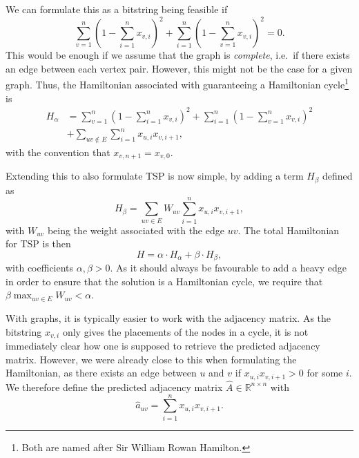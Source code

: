 We can formulate this as a bitstring being feasible if
\begin{equation}
    \sum_{v = 1}^n \left( 1 - \sum_{i = 1}^n x_{v,i} \right)^2 + \sum_{i = 1}^n \left( 1 - \sum_{v = 1}^n x_{v,i} \right)^2 = 0.
\end{equation}
This would be enough if we assume that the graph is \textit{complete}, i.e.\ if there exists an edge between each vertex pair.
However, this might not be the case for a given graph.
Thus, the Hamiltonian associated with guaranteeing a Hamiltonian cycle\footnote{Both are named after Sir William Rowan Hamilton.} is
\begin{equation}\label{eq:H_A}
\begin{split}
    H_{\alpha} &= \sum_{v = 1}^n \left( 1 - \sum_{i = 1}^n x_{v,i} \right)^2 + \sum_{i = 1}^n \left( 1 - \sum_{v = 1}^n x_{v,i} \right)^2 \\
    &+ \sum_{uv \notin E}\sum_{i = 1}^n x_{u,i}x_{v,i+1},
\end{split}
\end{equation}
with the convention that $x_{v,n+1} = x_{v,0}$.

Extending this to also formulate TSP is now simple, by adding a term $H_{\beta}$ defined as
\begin{equation}
    H_{\beta} = \sum_{uv \in E} W_{uv} \sum_{i = 1}^n x_{u,i}x_{v,i+1},
\end{equation}
with $W_{uv}$ being the weight associated with the edge $uv$.
The total Hamiltonian for TSP is then
\begin{equation}\label{eq:Hamilton_TSP}
    H = \alpha \cdot H_{\alpha} + \beta \cdot H_{\beta},
\end{equation}
with coefficients $\alpha,\beta > 0$.
As it should always be favourable to add a heavy edge in order to ensure that the solution is a Hamiltonian cycle, we require that $\beta \max_{uv \in E} W_{uv} < \alpha$.

With graphs, it is typically easier to work with the adjacency matrix.
As the bitstring $x_{v,i}$ only gives the placements of the nodes in a cycle, it is not immediately clear how one is supposed to retrieve the predicted adjacency matrix.
However, we were already close to this when formulating the Hamiltonian, as there exists an edge between $u$ and $v$ if $x_{u,i}x_{v,i+1} > 0$ for some $i$.
We therefore define the predicted adjacency matrix $\hat{A} \in \mathbb{R}^{n \times n}$ with
\begin{equation}\label{eq:A_sum}
    \hat{a}_{uv} = \sum_{i = 1}^n x_{u,i} x_{v,i+1}. 
\end{equation}


